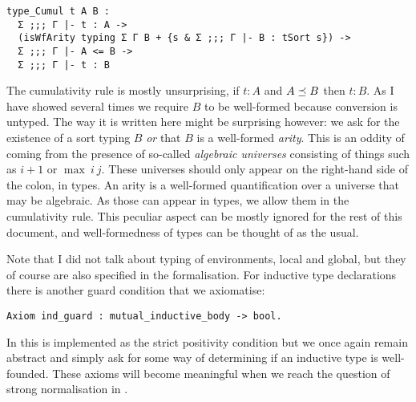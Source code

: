 \begin{verbatim}
type_Cumul t A B :
  Σ ;;; Γ |- t : A ->
  (isWfArity typing Σ Γ B + {s & Σ ;;; Γ |- B : tSort s}) ->
  Σ ;;; Γ |- A <= B ->
  Σ ;;; Γ |- t : B
\end{verbatim}
The cumulativity rule is mostly unsurprising, if \(t : A\) and \(A \preceq B\)
then \(t : B\). As I have showed several times we require \(B\) to be
well-formed because conversion is untyped.
The way it is written here might be surprising however: we ask for the existence
of a sort typing \(B\) \emph{or} that \(B\) is a well-formed \emph{arity}.
This is an oddity of \Coq coming from the presence of so-called
\emph{algebraic universes} consisting of things such as \(i+1\) or
\(\max\ i\ j\). These universes should only appear on the right-hand side of
the colon, \ie in types.
An arity is a well-formed quantification over a universe that may be
algebraic. As those can appear in types, we allow them in the cumulativity
rule.
This peculiar aspect can be mostly ignored for the rest of this document,
and well-formedness of types can be thought of as the usual.


Note that I did not talk about typing of environments, local and global, but
they of course are also specified in the formalisation.
For inductive type declarations there is another guard condition that we
axiomatise:
\begin{verbatim}
Axiom ind_guard : mutual_inductive_body -> bool.
\end{verbatim}
In \Coq this is implemented as the strict positivity condition but we once again
remain abstract and simply ask for some way of determining if an inductive type
is well-founded.
These axioms will become meaningful when we reach the question of strong
normalisation in .